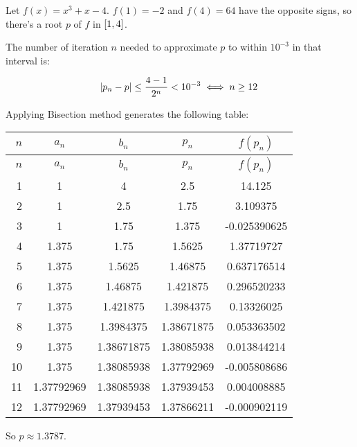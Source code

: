 \documentclass[../../../../Assignments.tex]{subfiles}
\begin{document}
\begin{solution}
    Let \(f(x) = x^3 + x − 4\). \(f(1) = -2\) and \(f(4) = 64\) have the
    opposite signs, so there's a root \(p\) of \(f\) in \(\interval{1}{4}\).

    The number of iteration \(n\) needed to approximate \(p\) to within
    \(10^{-3}\) in that interval is:

    \[\abs{p_n - p} \leq \frac{4 - 1}{2^n} < 10^{-3} \iff n \geq 12\]

    Applying Bisection method generates the following table:

    \begin{longtable}{r S[table-format=1.8] S[table-format=1.8] S[table-format=1.8] S[table-format=-1.9]}
        \toprule
        \(n\)  &   {\(a_n\)}   &   {\(b_n\)}   &   {\(p_n\)}   &  {\(f(p_n)\)}  \\
        \midrule
        \endfirsthead
        \(n\)  &   {\(a_n\)}   &   {\(b_n\)}   &   {\(p_n\)}   &  {\(f(p_n)\)}  \\
        \midrule
          &  1            &  4            &  2.5          &  14.125        \\
            2  &  1            &  2.5          &  1.75         &   3.109375     \\
            3  &  1            &  1.75         &  1.375        &  -0.025390625  \\
            4  &  1.375        &  1.75         &  1.5625       &   1.37719727   \\
            5  &  1.375        &  1.5625       &  1.46875      &   0.637176514  \\
            6  &  1.375        &  1.46875      &  1.421875     &   0.296520233  \\
            7  &  1.375        &  1.421875     &  1.3984375    &   0.13326025   \\
            8  &  1.375        &  1.3984375    &  1.38671875   &   0.053363502  \\
            9  &  1.375        &  1.38671875   &  1.38085938   &   0.013844214  \\
           10  &  1.375        &  1.38085938   &  1.37792969   &  -0.005808686  \\
           11  &  1.37792969   &  1.38085938   &  1.37939453   &   0.004008885  \\
           12  &  1.37792969   &  1.37939453   &  1.37866211   &  -0.000902119  \\
        \bottomrule
    \end{longtable}

    So \(p \approx \num{1.3787}\).
\end{solution}
\end{document}
